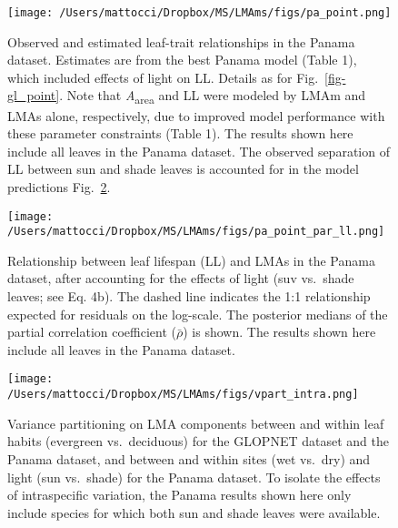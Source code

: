 \documentclass[
  12pt,
  letterpaper,
  DIV=11,
  numbers=noendperiod]{scrartcl}
\begin{document}
\newpage

\begin{figure}

{\centering \texttt{[image: /Users/mattocci/Dropbox/MS/LMAms/figs/pa\_point.png]}

}

\caption{\label{fig-pa_point}Observed and estimated leaf-trait
relationships in the Panama dataset. Estimates are from the best Panama
model (Table 1), which included effects of light on LL. Details as for
Fig.~\ref{fig-gl_point}. Note that \emph{A}\textsubscript{area} and LL
were modeled by LMAm and LMAs alone, respectively, due to improved model
performance with these parameter constraints (Table 1). The results
shown here include all leaves in the Panama dataset. The observed
separation of LL between sun and shade leaves is accounted for in the
model predictions Fig.~\ref{fig-ll_point}.}

\end{figure}

\newpage

\begin{figure}

{\centering \texttt{[image: /Users/mattocci/Dropbox/MS/LMAms/figs/pa\_point\_par\_ll.png]}

}

\caption{\label{fig-ll_point}Relationship between leaf lifespan (LL) and
LMAs in the Panama dataset, after accounting for the effects of light
(suv vs.~shade leaves; see Eq. 4b). The dashed line indicates the 1:1
relationship expected for residuals on the log-scale. The posterior
medians of the partial correlation coefficient (\(\bar{\rho}\)) is
shown. The results shown here include all leaves in the Panama dataset.}

\end{figure}

\newpage

\begin{figure}

{\centering \texttt{[image: /Users/mattocci/Dropbox/MS/LMAms/figs/vpart\_intra.png]}

}

\caption{\label{fig-vpart}Variance partitioning on LMA components
between and within leaf habits (evergreen vs.~deciduous) for the GLOPNET
dataset and the Panama dataset, and between and within sites (wet
vs.~dry) and light (sun vs.~shade) for the Panama dataset. To isolate
the effects of intraspecific variation, the Panama results shown here
only include species for which both sun and shade leaves were
available.}

\end{figure}
\end{document}
